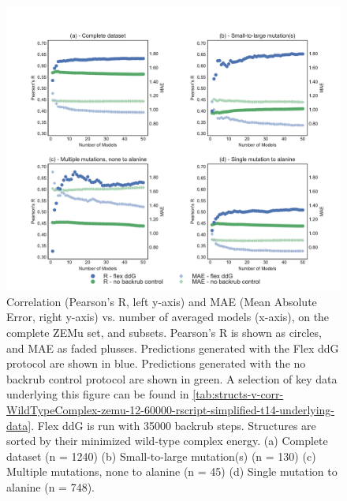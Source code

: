 \begin{figure}
  \includegraphics[width=\textwidth,keepaspectratio]{structs-v-corr-WildTypeComplex-zemu-12-60000-rscript-simplified-t14.pdf}
  \caption[]{
    Correlation (Pearson's R, left y-axis) and MAE (Mean Absolute Error, right y-axis) vs. number of averaged models (x-axis), on the complete ZEMu set, and subsets.
    Pearson's R is shown as circles, and MAE as faded plusses.
Predictions generated with the Flex ddG protocol are shown in blue.
Predictions generated with the no backrub control protocol are shown in green.
    A selection of key data underlying this figure can be found in \cref{tab:structs-v-corr-WildTypeComplex-zemu-12-60000-rscript-simplified-t14-underlying-data}. Flex ddG is run with 35000 backrub steps.
    Structures are sorted by their minimized wild-type complex energy. 
    (a) Complete dataset (n = 1240)
    (b) Small-to-large mutation(s) (n = 130)
    (c) Multiple mutations, none to alanine (n = 45)
    (d) Single mutation to alanine (n = 748).
  } \label{fig:structs-v-corr-WildTypeComplex-zemu-12-60000-rscript-simplified-t14}
\end{figure}
